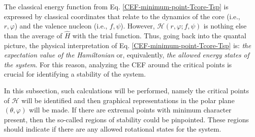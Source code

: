 The classical energy function from Eq. \ref{CEF-minimum-point-Tcore-Tsp} is expressed by classical coordinates that relate to the dynamics of the core (i.e., $r,\varphi$) and the valence nucleon (i.e., $f,\psi$). However, $\mathcal{H}(r,\varphi;f,\psi)$ is nothing else than the average of $\hat{H}$ with the trial function. Thus, going back into the quantal picture, the physical interpretation of Eq. \ref{CEF-minimum-point-Tcore-Tsp} is: \emph{the expectation value of the Hamiltonian} or, equivalently, \emph{the allowed energy states of the system}. For this reason, analyzing the CEF around the critical points is crucial for identifying a stability of the system. 

In this subsection, such calculations will be performed, namely the critical points of $\mathcal{H}$ will be identified and then graphical representations in the polar plane $(\theta,\varphi)$ will be made. If there are extremal points with minimum character present, then the so-called regions of stability could be pinpointed. These regions should indicate if there are any allowed rotational states for the system.


